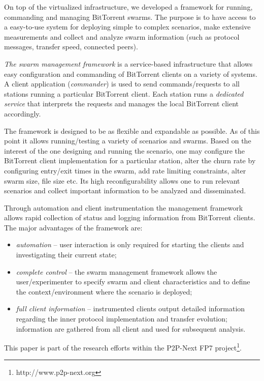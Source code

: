 On top of the virtualized infrastructure, we developed a framework for
running, commanding and managing BitTorrent swarms. The purpose is to have
access to a easy-to-use system for deploying simple to complex scenarios, make
extensive measurements and collect and analyze swarm information (such as
protocol messages, transfer speed, connected peers).

\textit{The swarm management framework} is a service-based infrastructure that
allows easy configuration and commanding of BitTorrent clients on a variety of
systems. A client application (\textit{commander}) is used to send
commands/requests to all stations running a particular BitTorrent client. Each
station runs a \textit{dedicated service} that interprets the requests and
manages the local BitTorrent client accordingly.

The framework is designed to be as flexible and expandable as possible. As of
this point it allows running/testing a variety of scenarios and swarms. Based
on the interest of the one designing and running the scenario, one may
configure the BitTorrent client implementation for a particular station, alter
the churn rate by configuring entry/exit times in the swarm, add rate limiting
constraints, alter swarm size, file size etc. Its high reconfigurability
allows one to run relevant scenarios and collect important information to be
analyzed and disseminated.

Through automation and client instrumentation the management framework allows
rapid collection of status and logging information from BitTorrent clients.
The major advantages of the framework are:

\begin{itemize}
  \item \textit{automation} -- user interaction is only required for starting
  the clients and investigating their current state;
  \item \textit{complete control} -- the swarm management framework allows the
  user/experimenter to specify swarm and client characteristics and to define
  the context/environment where the scenario is deployed;
  \item \textit{full client information} -- instrumented clients output
  detailed information regarding the inner protocol implementation and
  transfer evolution; information are gathered from all client and used for
  subsequent analysis.
\end{itemize}

This paper is part of the research efforts within the P2P-Next FP7
project\footnote{http://www.p2p-next.org}.


